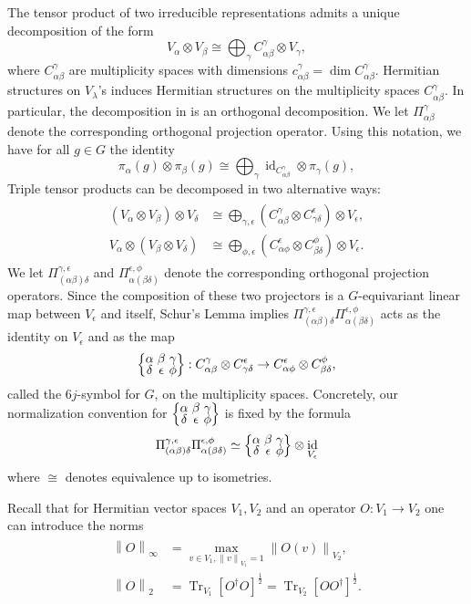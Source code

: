 \documentclass[notitlepage, 11pt, letterpaper]{amsart}
\theoremstyle{plain}
\theoremstyle{definition}
\let\cref\crtcref
\DeclareMathOperator{\Tr}{Tr}
\DeclareMathOperator{\id}{id}
\newcommand{\norm}[1]{\left\lVert#1\right\rVert}
\newcommand{\ot}{\otimes} %
\newcommand{\projl}{\Pi_{(\ya \yb) \yd}^{\yc, \ye}}
\newcommand{\projr}{\Pi_{\ya (\yb \yd)}^{\ye, \yf}}
\newcommand{\ya}{\alpha}
\newcommand{\yb}{\beta}
\newcommand{\yc}{\gamma}
\newcommand{\yd}{\delta}
\newcommand{\ye}{\epsilon}
\newcommand{\yf}{\phi}
\newcommand{\yx}{\lambda}
\newcommand{\tightcurlysixj}[1]{
\begingroup
\arraycolsep=1.5pt
\renewcommand{\arraystretch}{0.3}
\left\{\!\begin{array}{ccc}
    #1
\end{array}\!\right\}
\endgroup
}
\newcommand{\abcdefsymbol}{\tightcurlysixj{\alpha & \beta & \gamma \\ \delta & \epsilon & \phi}}
\begin{document}
The tensor product of two irreducible representations admits a unique decomposition of the form
\begin{equation}
    \label{eq:tensor_product}
    V_\ya \ot V_\yb \cong \bigoplus_\yc C_{\ya \yb}^\yc \ot V_\yc,
\end{equation}
where $C_{\ya \yb}^\yc$ are multiplicity spaces with dimensions $c_{\ya \yb}^\yc = \dim  C_{\ya \yb}^\yc$.
Hermitian structures on $V_\yx$'s induces  Hermitian structures on the multiplicity spaces $C_{\ya \yb}^\yc$.
In particular, the decomposition in \cref{eq:tensor_product} is an orthogonal decomposition.
We let $\Pi_{\ya \yb}^\yc$ denote the corresponding orthogonal projection operator.
Using this notation, we have for all $g \in G$ the identity
\begin{equation}
    \label{eq:operator product}
    \pi_\ya(g) \ot \pi_\yb(g) \cong \bigoplus_{\yc} \id_{C_{\ya \yb}^\yc} \ot \pi_\yc(g),
\end{equation}
Triple tensor products can be decomposed in two alternative ways:
\begin{align}
    \label{eq:triple_tensor_product}
    \begin{split}
        (V_\ya \ot V_\yb) \ot V_\yd
        &\cong \bigoplus_{\yc, \ye} (C_{\ya \yb}^\yc \ot C_{\yc \yd}^\ye) \ot V_\ye,\\
        V_\ya \ot (V_\yb \ot V_\yd)
        &\cong \bigoplus_{\yf, \ye} (C_{\ya \yf}^\ye \ot C_{\yb \yd}^\yf)\ot V_\ye.
    \end{split}
\end{align}
We let $\projl$ and $\projr$ denote the corresponding orthogonal projection operators.
Since the composition of these two projectors is a $G$-equivariant linear map between $V_{\ye}$ and itself, Schur's Lemma implies $\projl \projr$ acts as the identity on $V_{\ye}$ and as the map
\begin{equation}
   \abcdefsymbol : C_{\ya \yb}^\yc \ot C_{\yc \yd}^\ye \to C_{\ya \yf}^\ye \ot C_{\yb \yd}^\yf,
\end{equation}
called the $6j$-symbol for $G$, on the multiplicity spaces.
Concretely, our normalization convention for $\abcdefsymbol$ is fixed by the formula
\begin{equation}
    \label{eq:prod_proj_6j}
    \projl \projr \simeq
    \abcdefsymbol \ot \id_{V_{\ye}}
\end{equation}
where $\cong$ denotes equivalence up to isometries.

Recall that for Hermitian vector spaces $V_{1}, V_{2}$ and an operator $O: V_{1} \to V_{2}$ one can introduce the norms
\begin{align}
    \begin{split}
        \norm{O}_{\infty} &= \max_{v \in V_1, \norm{v}_{V_1} = 1} \norm{O(v)}_{V_2}, \\
        \norm{O}_{2} &= \Tr_{V_1}[O^{\dagger} O]^{\frac{1}{2}} = \Tr_{V_2}[O O^{\dagger}]^{\frac{1}{2}}.
    \end{split}
\end{align}
\end{document}
